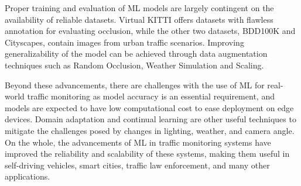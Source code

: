 \documentclass[12pt,a4paper]{report}
\theoremstyle{definition}
\theoremstyle{remark}
\begin{document}
Proper training and evaluation of ML models are largely contingent on the availability of reliable datasets. Virtual KITTI offers datasets with flawless annotation for evaluating occlusion, while the other two datasets, BDD100K and Cityscapes, contain images from urban traffic scenarios. Improving generalizability of the model can be achieved through data augmentation techniques such as Random Occlusion, Weather Simulation and Scaling.

Beyond these advancements, there are challenges with the use of ML for real-world traffic monitoring as model accuracy is an essential requirement, and models are expected to have low computational cost to ease deployment on edge devices. Domain adaptation and continual learning are other useful techniques to mitigate the challenges posed by changes in lighting, weather, and camera angle. On the whole, the advancements of ML in traffic monitoring systems have improved the reliability and scalability of these systems, making them useful in self-driving vehicles, smart cities, traffic law enforcement, and many other applications.
\end{document}
